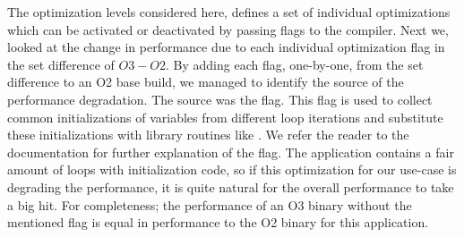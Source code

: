 The optimization levels considered here, defines a set of individual optimizations which can be activated or deactivated by passing flags to the compiler.
Next we, looked at the change in performance due to each individual optimization flag in the set difference of $O3-O2$.
By adding each flag, one-by-one, from the set difference to an O2 base build, we managed to identify the source of the performance degradation.
The source was the  flag.
This flag is used to collect common initializations of variables from different loop iterations and substitute these initializations with library routines like .
We refer the reader to the  documentation \cite{web:gcc} for further explanation of the flag.
The {\cg} application contains a fair amount of loops with initialization code, so if this optimization for our use-case is degrading the performance, it is quite natural for the overall performance to take a big hit.
For completeness; the performance of an O3 binary without the mentioned flag is equal in performance to the O2 binary for this application.



